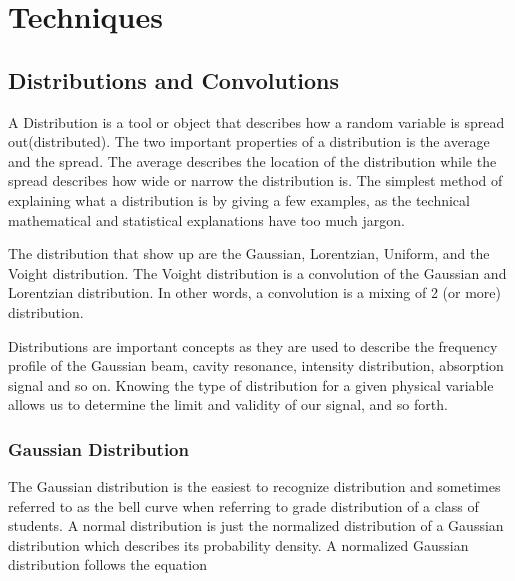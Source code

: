\documentclass[11pt,a4paper]{book}
\begin{document}
\chapter{Techniques}

	\section{Distributions and Convolutions}
		\label{sec:Distribution}
		A Distribution is a tool or object that describes how a random variable is spread out(distributed). The two important properties of a distribution is the average and the spread. The average describes the location of the distribution while the spread describes how wide or narrow the distribution is. The simplest method of explaining what a distribution is by giving a few examples, as the technical mathematical and statistical explanations have too much jargon. 
		
		The distribution that show up are the Gaussian, Lorentzian, Uniform, and the Voight distribution. The Voight distribution is a convolution of the Gaussian and Lorentzian distribution. In other words, a convolution is a mixing of 2 (or more) distribution.
		
		Distributions are important concepts as they are used to describe the frequency profile of the Gaussian beam, cavity resonance, intensity distribution, absorption signal and so on. Knowing the type of distribution for a given physical variable allows us to determine the limit and validity of our signal, and so forth.
		
		\subsection{Gaussian Distribution}
			\label{ssec:GaussianDistribution}
			The Gaussian distribution is the easiest to recognize distribution and sometimes referred to as the bell curve when referring to grade distribution of a class of students. A normal distribution is just the normalized distribution of a Gaussian distribution which describes its probability density. A normalized Gaussian distribution follows the equation
		
\end{document}
